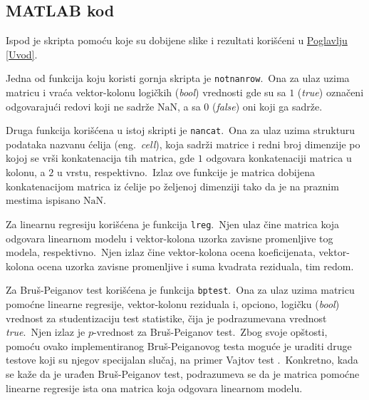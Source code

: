 \documentclass[12pt,a4paper,titlepage,oneside]{article}
\numberwithin{equation}{section}
\numberwithin{figure}{section}
\numberwithin{table}{section}
\theoremstyle{definition}
\theoremstyle{remark}
\begin{document}
\newpage

\thispagestyle{empty}

\begin{appendices}

\section{MATLAB kod}

\setcounter{footnote}{0}

Ispod je skripta pomoću koje su dobijene slike i rezultati korišćeni u \hyperref[Uvod]{Poglavlju \ref*{Uvod}}.


Jedna od funkcija koju koristi gornja skripta je \texttt{notnanrow}.\ Ona za ulaz uzima matricu i vraća vektor-kolonu logičkih (\textit{bool}) vrednosti gde su sa $1$ (\textit{true}) označeni odgovarajući redovi koji ne sadrže $\text{NaN}$, a sa $0$ (\textit{false}) oni koji ga sadrže.


Druga funkcija korišćena u istoj skripti je \texttt{nancat}.\ Ona za ulaz uzima strukturu podataka nazvanu ćelija (eng.\ \textit{cell}), koja sadrži matrice i redni broj dimenzije po kojoj se vrši konkatenacija tih matrica, gde $1$ odgovara konkatenaciji matrica u kolonu, a $2$ u vrstu, respektivno.\ Izlaz ove funkcije je matrica dobijena konkatenacijom matrica iz ćelije po željenoj dimenziji tako da je na praznim mestima ispisano $\text{NaN}$.


Za linearnu regresiju korišćena je funkcija \texttt{lreg}.\ Njen ulaz čine matrica koja odgovara linearnom modelu i vektor-kolona uzorka zavisne promenljive tog modela, respektivno.\ Njen izlaz čine vektor-kolona ocena koeficijenata, vektor-kolona ocena uzorka zavisne promenljive i suma kvadrata reziduala, tim redom.


Za Bruš-Peiganov test korišćena je funkcija \texttt{bptest}.\ Ona za ulaz uzima matricu pomoćne linearne regresije, vektor-kolonu reziduala i, opciono, logičku (\textit{bool}) vrednost za studentizaciju test statistike, čija je podrazumevana vrednost \textit{true}.\ Njen izlaz je $p$-vrednost za Bruš-Peiganov test.\ Zbog svoje opštosti, pomoću ovako implementiranog Bruš-Peiganovog testa moguće je uraditi druge testove koji su njegov specijalan slučaj, na primer Vajtov test \cite{Wh, Wa}.\ Konkretno, kada se kaže da je urađen Bruš-Peiganov test, podrazumeva se da je matrica pomoćne linearne regresije ista ona matrica koja odgovara linearnom modelu.



\end{appendices}
\end{document}
